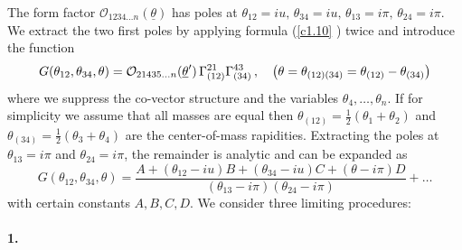 \documentclass[a4paper,a4paper]{article}
\begin{document}
The form factor $\mathcal{O}_{1234\dots n}(\underline{\theta })$ has poles
at $\theta _{12}=iu,\,\theta _{34}=iu,\,\theta _{13}=i\pi ,\,\theta
_{24}=i\pi .$ We extract the two first poles by applying formula (\ref{c1.10}%
) twice and introduce the function 
\[
G(\theta _{12},\theta _{34},\theta )=\mathcal{O}_{21435\dots n}(\underline{%
\theta }^{\prime })\,\Gamma _{(12)}^{21}\Gamma _{(34)}^{43}\,,\quad \left(
\theta =\theta _{(12)(34)}=\theta _{(12)}-\theta _{(34)}\right) 
\]
where we suppress the co-vector structure and the variables $\theta
_{4},\dots ,\theta _{n}$. If for simplicity we assume that all masses are
equal then $\theta _{(12)}=\frac{1}{2}(\theta _{1}+\theta _{2})$ and $\theta
_{(34)}=\frac{1}{2}(\theta _{3}+\theta _{4})$ are the center-of-mass
rapidities. Extracting the poles at $\theta _{13}=i\pi $ and $\theta
_{24}=i\pi $, the remainder is analytic and can be expanded as 
\begin{equation}
G(\theta _{12},\theta _{34},\theta )=\frac{A+(\theta _{12}-iu)B+(\theta
_{34}-iu)C+(\theta -i\pi )D}{(\theta _{13}-i\pi )(\theta _{24}-i\pi )}+\dots
\label{c1.20}
\end{equation}
with certain constants $A,B,C,D$. We consider three limiting procedures:

\paragraph{1.}
\end{document}
